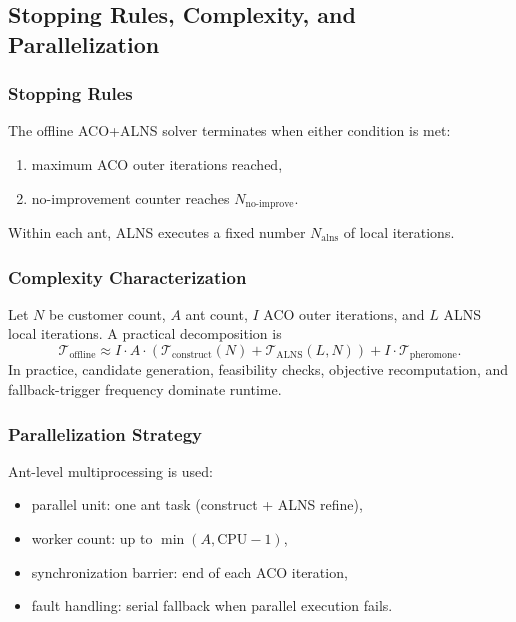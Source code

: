 \documentclass[review,12pt]{elsarticle}
\begin{document}
\subsection{Stopping Rules, Complexity, and Parallelization}
\label{subsec:stop_complexity_parallel}

\subsubsection{Stopping Rules}

The offline ACO+ALNS solver terminates when either condition is met:
\begin{enumerate}
  \item maximum ACO outer iterations reached,
  \item no-improvement counter reaches \(N_{\mathrm{no\text{-}improve}}\).
\end{enumerate}
Within each ant, ALNS executes a fixed number \(N_{\mathrm{alns}}\) of local iterations.

\subsubsection{Complexity Characterization}

Let \(N\) be customer count, \(A\) ant count, \(I\) ACO outer iterations, and \(L\) ALNS local iterations. A practical decomposition is
\begin{equation}
\mathcal{T}_{\mathrm{offline}}
\approx
I\cdot A\cdot\left(
\mathcal{T}_{\mathrm{construct}}(N)+\mathcal{T}_{\mathrm{ALNS}}(L,N)
\right)
 + I\cdot \mathcal{T}_{\mathrm{pheromone}}.
\label{eq:complexity}
\end{equation}
In practice, candidate generation, feasibility checks, objective recomputation, and fallback-trigger frequency dominate runtime.

\subsubsection{Parallelization Strategy}

Ant-level multiprocessing is used:
\begin{itemize}
  \item parallel unit: one ant task (construct + ALNS refine),
  \item worker count: up to \(\min(A,\mathrm{CPU}-1)\),
  \item synchronization barrier: end of each ACO iteration,
  \item fault handling: serial fallback when parallel execution fails.
\end{itemize}
\end{document}
